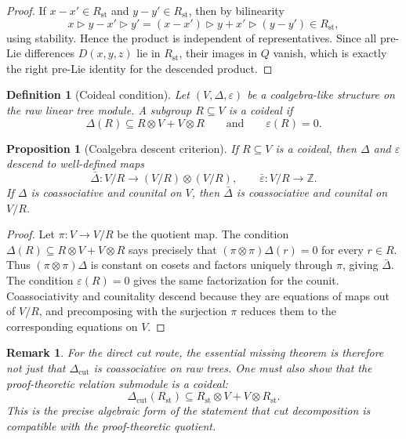 \documentclass[11pt]{article}
\newtheorem{proposition}[theorem]{Proposition}
\newtheorem{definition}[theorem]{Definition}
\newtheorem{remark}[theorem]{Remark}
\newcommand{\ZZ}{\mathbb{Z}}
\begin{document}
\begin{proof}
If \(x-x'\in R_{\mathrm{st}}\) and \(y-y'\in R_{\mathrm{st}}\), then by
bilinearity
\[
x\triangleright y-x'\triangleright y'
=(x-x')\triangleright y+x'\triangleright (y-y')
\in R_{\mathrm{st}},
\]
using stability. Hence the product is independent of representatives. Since
all pre-Lie differences \(D(x,y,z)\) lie in \(R_{\mathrm{st}}\), their images
in \(Q\) vanish, which is exactly the right pre-Lie identity for the descended
product.
\end{proof}

\begin{definition}[Coideal condition]
Let \((V,\Delta,\varepsilon)\) be a coalgebra-like structure on the raw
linear tree module. A subgroup \(R\subseteq V\) is a \emph{coideal} if
\[
\Delta(R)\subseteq R\otimes V+V\otimes R
\qquad\text{and}\qquad
\varepsilon(R)=0.
\]
\end{definition}

\begin{proposition}[Coalgebra descent criterion]
If \(R\subseteq V\) is a coideal, then \(\Delta\) and \(\varepsilon\) descend
to well-defined maps
\[
\bar{\Delta}:V/R\to (V/R)\otimes (V/R),
\qquad
\bar{\varepsilon}:V/R\to \ZZ.
\]
If \(\Delta\) is coassociative and counital on \(V\), then
\(\bar{\Delta}\) is coassociative and counital on \(V/R\).
\end{proposition}

\begin{proof}
Let \(\pi:V\to V/R\) be the quotient map. The condition
\(\Delta(R)\subseteq R\otimes V+V\otimes R\) says precisely that
\((\pi\otimes\pi)\Delta(r)=0\) for every \(r\in R\). Thus
\((\pi\otimes\pi)\Delta\) is constant on cosets and factors uniquely through
\(\pi\), giving \(\bar{\Delta}\). The condition \(\varepsilon(R)=0\) gives the
same factorization for the counit. Coassociativity and counitality descend
because they are equations of maps out of \(V/R\), and precomposing with the
surjection \(\pi\) reduces them to the corresponding equations on \(V\).
\end{proof}

\begin{remark}
For the direct cut route, the essential missing theorem is therefore not just
that \(\Delta_{\mathrm{cut}}\) is coassociative on raw trees. One must also
show that the proof-theoretic relation submodule is a coideal:
\[
\Delta_{\mathrm{cut}}(R_{\mathrm{st}})
\subseteq
R_{\mathrm{st}}\otimes V+V\otimes R_{\mathrm{st}}.
\]
This is the precise algebraic form of the statement that cut decomposition is
compatible with the proof-theoretic quotient.
\end{remark}
\end{document}
